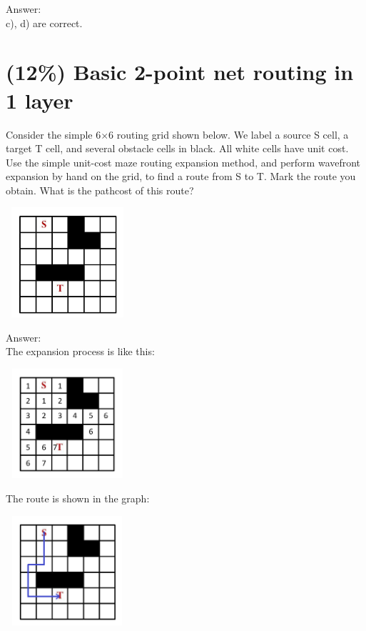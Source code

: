 \documentclass[12pt]{article}
\begin{document}
        \noindent
        Answer:\\

        c), d) are correct.

    \section{(12\%) Basic 2-point net routing in 1 layer}

        Consider the simple 6$\times$6 routing grid shown below. We label a source S cell, a
        target T cell, and several obstacle cells in black. All white cells have unit cost.
        Use the simple unit-cost maze routing expansion method, and perform wavefront
        expansion by hand on the grid, to find a route from S to T. Mark the route you obtain.
        What is the pathcost of this route?

        \begin{center}
            \includegraphics[width = 1.80in, height = 1.60in]{figure3.png}
        \end{center}

        \noindent
        Answer:\\

        \noindent
        The expansion process is like this:

        \begin{center}
            \includegraphics[width = 1.80in, height = 1.60in]{figure4.png}
        \end{center}

        \noindent
        The route is shown in the graph:

        \begin{center}
            \includegraphics[width = 1.80in, height = 1.60in]{figure5.png}
        \end{center}
\end{document}
